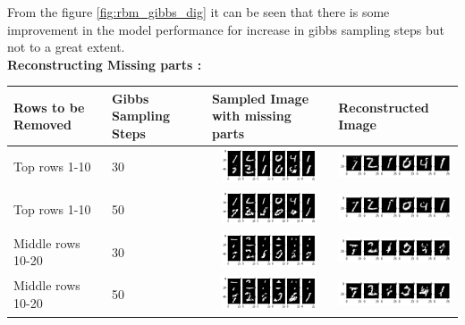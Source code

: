 From the figure \ref{fig:rbm_gibbs_dig} it can be seen that there is some improvement in the model performance for increase in gibbs sampling steps but not to a great extent.\\
\textbf{Reconstructing Missing parts :} 
\begin{table}[!htpb]
	\centering
	\begin{tabular}{|p{4cm}|p{2cm}|p{4cm}|p{4.5cm}|}
		\cellcolor{blue!25}Rows to be Removed & \cellcolor{blue!25} Gibbs Sampling Steps & \cellcolor{blue!25} Sampled Image with missing parts  & \cellcolor{blue!25} Reconstructed Image \\ \hline
		Top rows 1-10 & 30 & \includegraphics[height=1cm, width=3.5cm]{Exercise4/Report/reconst_gibs_30_row_1-10} & \includegraphics[height=1cm]{Exercise4/Report/reconst_gibs_30_row_1-10_1}\\ \hline
		Top rows 1-10 & 50 & \includegraphics[height=1cm, width=3.5cm]{Exercise4/Report/reconst_gibs_50_row_1-10} & \includegraphics[height=1cm]{Exercise4/Report/reconst_gibs_50_row_1-10_1}\\ \hline
		Middle rows 10-20 & 30 & \includegraphics[height=1cm, width=3.5cm]{Exercise4/Report/reconst_gibs_30_row_10-20} & \includegraphics[height=1cm]{Exercise4/Report/reconst_gibs_30_row_10-20_1}\\ \hline
		Middle rows 10-20 & 50 & \includegraphics[height=1cm, width=3.5cm]{Exercise4/Report/reconst_gibs_50_row_10-20} & \includegraphics[height=1cm]{Exercise4/Report/reconst_gibs_50_row_10-20_1}\\ \hline

\end{tabular}
\end{table}

